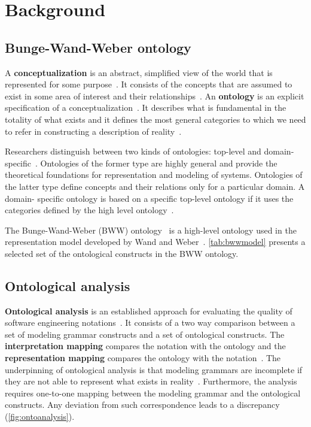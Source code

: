 \chapter{Background}
\label{sec:background}

\section{Bunge-Wand-Weber ontology}


A \textbf{conceptualization} is an abstract, simplified view of the world that is represented for
some purpose~\cite{gruber1995toward}. It consists of the concepts that are assumed to exist in some
area of interest and their relationships~\cite{gruber1995toward}. An \textbf{ontology} is an
explicit specification of a conceptualization~\cite{gruber1995toward}. It describes what is
fundamental in the totality of what exists and it defines the most general categories to which we
need to refer in constructing a description of reality~\cite{milton2004top}.

Researchers distinguish between two kinds of ontologies: top-level and domain-
specific~\cite{milton2004top}. Ontologies of the former type are highly general and provide the
theoretical foundations for representation and modeling of systems. Ontologies of the latter type
define concepts and their relations only for a particular domain. A domain- specific ontology is
based on a specific top-level ontology if it uses the categories defined by the high level
ontology~\cite{milton2004top}.

The Bunge-Wand-Weber (BWW) ontology~\cite{wand1990ontological} is a high-level ontology used in the
representation model developed by Wand and Weber~\cite{wand1995deep}. \autoref{tab:bwwmodel}
presents a selected set of the ontological constructs in the BWW ontology.

\section{Ontological analysis}

\textbf{Ontological analysis} is an established approach for evaluating the quality of software engineering notations~\cite{moody2009physics}. It consists of a two way comparison between a set of modeling grammar constructs and a set of ontological constructs. The \textbf{interpretation mapping} compares the notation with the ontology and the \textbf{representation mapping} compares the ontology with the notation~\cite{gehlert2007toward}. The underpinning of ontological analysis is that modeling grammars are incomplete if they are not able to represent what exists in reality~\cite{green2000integrated}. Furthermore, the analysis requires one-to-one mapping between the modeling grammar and the ontological constructs. Any deviation from such correspondence leads to a discrepancy (\autoref{fig:ontoanalysis}).

